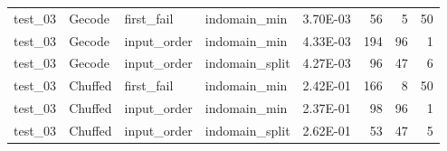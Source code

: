 \begin{compactfloats}
\begin{table}[H]
\begin{tabular}{l l l l l r r r}
    \midrule
    test\_03 & Gecode  & first\_fail  & indomain\_min   & 3.70E-03 & 56  & 5   & 50 \\
    test\_03 & Gecode  & input\_order & indomain\_min   & 4.33E-03 & 194 & 96  & 1  \\
    test\_03 & Gecode  & input\_order & indomain\_split & 4.27E-03 & 96  & 47  & 6  \\
    test\_03 & Chuffed & first\_fail  & indomain\_min   & 2.42E-01 & 166 & 8   & 50 \\
    test\_03 & Chuffed & input\_order & indomain\_min   & 2.37E-01 & 98  & 96  & 1  \\
    test\_03 & Chuffed & input\_order & indomain\_split & 2.62E-01 & 53  & 47  & 5  \\
    \bottomrule
  \end{tabular}
\end{table}


\end{compactfloats}
